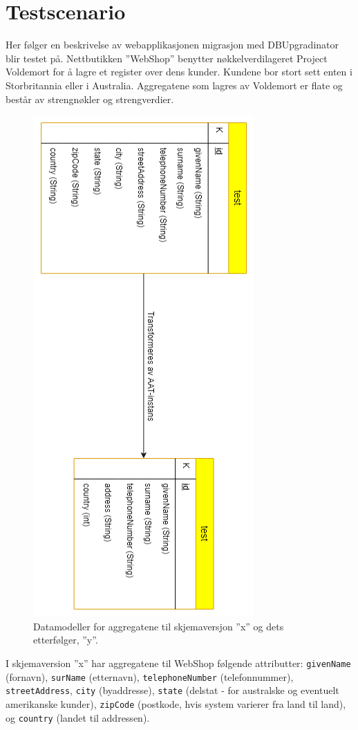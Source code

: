 \section{Testscenario}

Her følger en beskrivelse av webapplikasjonen migrasjon med DBUpgradinator blir testet på. Nettbutikken ''WebShop'' benytter nøkkelverdi\-lageret Project Voldemort for å lagre et register over dens kunder. Kundene bor stort sett enten i Storbritannia eller i Australia. Aggregatene som lagres av Voldemort er flate og består av strengnøkler og strengverdier.

\begin{figure}[hbtp]
    \centering
    \includegraphics[scale=0.8]{fig/WSS-AggregatModell.png}
    \caption{Datamodeller for aggregatene til skjemaversjon ''x'' og dets etterfølger, ''y''.}
    \label{fig11}
\end{figure}

I skjemaversion ''x'' har aggregatene til WebShop følgende attributter: \texttt{givenName} (fornavn), \texttt{surName} (etternavn), \texttt{telephoneNumber} (telefonnummer), \texttt{streetAddress}, \texttt{city} (byaddresse), \texttt{state} (delstat - for australske og eventuelt amerikanske kunder), \texttt{zipCode} (postkode, hvis system varierer fra land til land), og \texttt{country} (landet til addressen).
